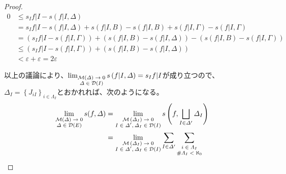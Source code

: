 \documentclass[dvipdfmx]{jsarticle}
\begin{document}
\begin{proof}
\begin{align*}
0 &\leq s_{I}f|I - s\left( f|I,\varDelta \right)\\
&= s_{I}f|I - s\left( f|I,\varDelta \right) + s\left( f|I,B \right) - s\left( f|I,B \right) + s\left( f|I,\varGamma \right) - s\left( f|I,\varGamma \right)\\
&= \left( s_{I}f|I - s\left( f|I,\varGamma \right) \right) + \left( s\left( f|I,B \right) - s\left( f|I,\varDelta \right) \right) - \left( s\left( f|I,B \right) - s\left( f|I,\varGamma \right) \right)\\
&\leq \left( s_{I}f|I - s\left( f|I,\varGamma \right) \right) + \left( s\left( f|I,B \right) - s\left( f|I,\varDelta \right) \right)\\
&< \varepsilon + \varepsilon = 2\varepsilon
\end{align*}\par
以上の議論により、$\lim_{\scriptsize \begin{matrix}
\mathcal{M}(\varDelta) \rightarrow 0 \\
\varDelta \in \mathcal{D}(I) \\
\end{matrix}}{s\left( f|I,\varDelta \right)} = s_{I}f|I$が成り立つので、$\varDelta_{I} = \left\{ J_{iI} \right\}_{i \in \varLambda_{I}}$とおかれれば、次のようになる。
\begin{align*}
\lim_{\scriptsize \begin{matrix}
\mathcal{M}(\varDelta) \rightarrow 0 \\
\varDelta \in \mathcal{D}(E) \\
\end{matrix}}{s(f,\varDelta)} &= \lim_{\scriptsize \begin{matrix}
\mathcal{M}\left( \varDelta_{I} \right) \rightarrow 0 \\
I \in \varDelta', \varDelta_{I}\in \mathcal{D}(I) \\
\end{matrix}}{s\left( f,\bigsqcup_{I \in \varDelta' } \varDelta_{I} \right)}\\
&= \lim_{\scriptsize \begin{matrix}
\mathcal{M}\left( \varDelta_{I} \right) \rightarrow 0 \\
I \in \varDelta', \varDelta_{I}\in \mathcal{D}(I) \\
\end{matrix}}{\sum_{I \in \varDelta' } {\sum_{\scriptsize \begin{matrix}
i \in \varLambda_{I} \\
\#\varLambda_{I} < \aleph_{0} \\

\end{matrix}}}}
\end{align*}
\end{proof}
\end{document}
